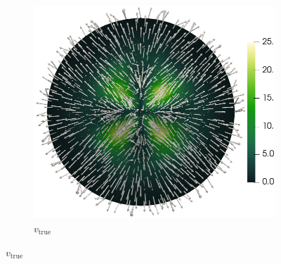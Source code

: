 \documentclass[10pt,final,xcolor=dvipsnames]{beamer}
\begin{document}
\begin{frame}
\begin{figure}
\begin{center}
\begin{subfigure}{0.49\textwidth}
				\includegraphics[scale=0.2]{trueVelocity2_glyphs.png}
				\caption{$v_\text{true}$}
				\label{fig:stokes_velocity}
			\end{subfigure}
		\end{center}
	\end{figure} 
\end{frame}
\end{document}
